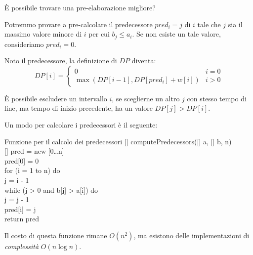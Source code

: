 \bigskip\noindent
È possibile trovare una pre-elaborazione migliore?

Potremmo provare a pre-calcolare il predecessore $pred_i=j$ di $i$ tale che
$j$ sia il massimo valore minore di $i$ per cui $b_j\leq a_i$. Se non esiste un
tale valore, consideriamo $pred_i=0$.

Noto il predecessore, la definizione di $DP$ diventa:
\[DP[i]=\begin{cases}
    0 & i=0\\
    \max\left(DP[i-1],DP[pred_i]+w[i]\right) & i>0
\end{cases}\]
\begin{note}
    È possibile escludere un intervallo $i$, se sceglierne un altro $j$ con
    stesso tempo di fine, ma tempo di inizio precedente, ha un valore
    $DP[j]>DP[i]$.
\end{note}
Un modo per calcolare i predecessori è il seguente:

\begin{minicode}{Funzione per il calcolo dei predecessori}
\ind{}[]  computePredecessors([] a, [] b,  n)\\
    [] pred = new [0\dots n]\\
    pred[0] = 0\\
    \indf for (i = 1 to n) do\\
        j = i - 1\\
        \indff while (j > 0 and b[j] > a[i]) do\\
            j = j - 1\\
        \indff pred[i] = j\\
    \indf return pred
\end{minicode}\noindent
Il costo di questa funzione rimane $O(n^2)$, ma esistono delle implementazioni
di \emph{complessità} $O(n\log n)$.

